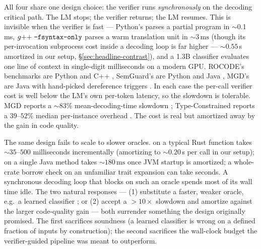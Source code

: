 All four share one design choice: the verifier runs
\emph{synchronously} on the decoding critical path. The LM stops; the
verifier returns; the LM resumes. This is invisible when the
verifier is fast --- Python's  parses a partial
program in $\sim$0.1\,ms, $g{+}{+}\;\texttt{-fsyntax-only}$ parses a
warm translation unit in ${\sim}3\,\mathrm{ms}$ (though its
per-invocation subprocess cost inside a decoding loop is far
higher --- $\sim$$0.55$\,s amortized in our setup,
\S\ref{sec:headline-contrast}), and a 1.3B classifier evaluates one
line of context in single-digit milliseconds on a modern GPU. ROCODE's
benchmarks are Python and C++ \citep{jiang2024rocode}, SemGuard's are
Python and Java \citep{wang2025semguard}, MGD's are Java with
hand-picked dereference triggers \citep{agrawal2023monitor}. In each
case the per-call verifier cost is well below the LM's own per-token
latency, so the slowdown is tolerable. MGD reports a $\sim$83\%
mean-decoding-time slowdown \citep{agrawal2023monitor};
Type-Constrained reports a $39$--$52\%$ median per-instance
overhead \citep{mundler2025typeconstrained}. The cost is real but
amortized away by the gain in code quality.

The same design fails to scale to slower oracles. 
on a typical Rust function takes $\sim$$35$--$500$
milliseconds incrementally (amortizing to $\sim$$0.20$\,s per call
in our setup);  on a single Java method takes
${\sim}180\,\mathrm{ms}$ once JVM startup is amortized; a
whole-crate borrow check on an unfamiliar trait expansion can take
seconds. A synchronous decoding loop that blocks on such an oracle
spends most of its wall time idle. The two natural responses --- (1)
substitute a faster, weaker oracle, e.g.\ a learned classifier
\citep{wang2025semguard}; or (2) accept a $>10\times$ slowdown and
amortize against the larger code-quality gain --- both surrender
something the design originally promised. The first sacrifices
soundness (a learned classifier is wrong on a defined fraction of
inputs by construction); the second sacrifices the wall-clock budget
the verifier-guided pipeline was meant to outperform.

